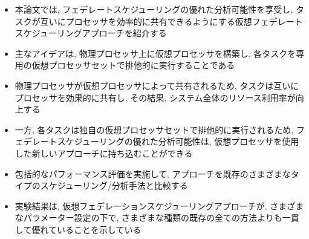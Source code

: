 \begin{frame}{}
    \begin{itemize}
        \item 本論文では, フェデレートスケジューリングの優れた分析可能性を享受し, タスクが互いにプロセッサを効率的に共有できるようにする仮想フェデレートスケジューリングアプローチを紹介する
\item 主なアイデアは, 物理プロセッサ上に仮想プロセッサを構築し, 各タスクを専用の仮想プロセッサセットで排他的に実行することである
\item 物理プロセッサが仮想プロセッサによって共有されるため, タスクは互いにプロセッサを効果的に共有し, その結果, システム全体のリソース利用率が向上する
\item 一方, 各タスクは独自の仮想プロセッサセットで排他的に実行されるため, フェデレートスケジューリングの優れた分析可能性は, 仮想プロセッサを使用した新しいアプローチに持ち込むことができる
\item 包括的なパフォーマンス評価を実施して, アプローチを既存のさまざまなタイプのスケジューリング/分析手法と比較する
\item 実験結果は, 仮想フェデレーションスケジューリングアプローチが, さまざまなパラメーター設定の下で, さまざまな種類の既存の全ての方法よりも一貫して優れていることを示している
    \end{itemize}
\end{frame}
